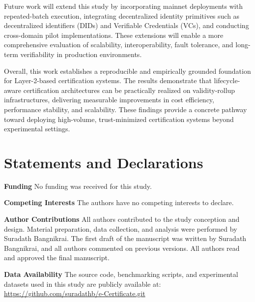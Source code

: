 \documentclass[pdflatex,sn-mathphys-num]{sn-jnl}
\begin{document}
Future work will extend this study by incorporating mainnet deployments with repeated-batch execution, integrating decentralized identity primitives such as decentralized identifiers (DIDs) and Verifiable Credentials (VCs), and conducting cross-domain pilot implementations. These extensions will enable a more comprehensive evaluation of scalability, interoperability, fault tolerance, and long-term verifiability in production environments.

Overall, this work establishes a reproducible and empirically grounded foundation for Layer-2-based certification systems. The results demonstrate that lifecycle-aware certification architectures can be practically realized on validity-rollup infrastructures, delivering measurable improvements in cost efficiency, performance stability, and scalability. These findings provide a concrete pathway toward deploying high-volume, trust-minimized certification systems beyond experimental settings.

\section*{Statements and Declarations}

\textbf{Funding}  
No funding was received for this study.

\textbf{Competing Interests}  
The authors have no competing interests to declare.

\textbf{Author Contributions}  
All authors contributed to the study conception and design. Material preparation, data collection, and analysis were performed by Suradath Bangnikrai. The first draft of the manuscript was written by Suradath Bangnikrai, and all authors commented on previous versions. All authors read and approved the final manuscript.

\textbf{Data Availability}  
The source code, benchmarking scripts, and experimental datasets used in this study are publicly available at:  
\url{https://github.com/suradathb/e-Certificate.git}


\end{document}
